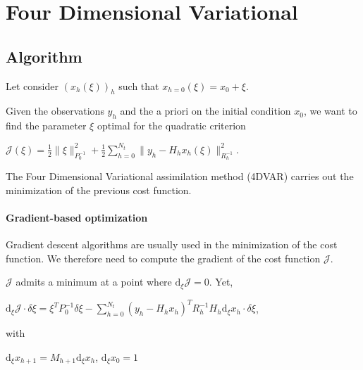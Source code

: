 \documentclass{tufte-book}
\begin{document}
\hypertarget{four_dimensional_variational}{}\section{\-Four Dimensional Variational}\label{four_dimensional_variational}


\hypertarget{four_dimensional_variational_algorithm4dv}{}\subsection{\-Algorithm}\label{four_dimensional_variational_algorithm4dv}

\-Let consider $ (x_h(\xi))_h $ such that $ x_{h=0}(\xi) = x_0 + \xi $.

\-Given the observations $ y_h $ and the a priori on the initial condition $ x_0 $, we want to find the parameter $ \xi $ optimal for the quadratic criterion \begin{center} $ \displaystyle \mathcal{J}(\xi) = \frac{1}{2} \| \xi \|^2_{P_0^{-1}} + \frac{1}{2} \displaystyle\sum\limits_{h=0}^{N_t} \|y_h - H_h x_h(\xi) \|^2_{R_h^{-1}} $. \end{center}

\-The \-Four \-Dimensional \-Variational assimilation method (4\-D\-V\-A\-R) carries out the minimization of the previous cost function.

\hypertarget{four_dimensional_variational_algorithm4dv0}{}\paragraph{\-Gradient-\/based optimization}\label{four_dimensional_variational_algorithm4dv0}

\-Gradient descent algorithms are usually used in the minimization of the cost function. \-We therefore need to compute the gradient of the cost function $ \mathcal{J}$.

$ \mathcal{J}$ admits a minimum at a point where $ \mathrm{d}_\xi \mathcal{J} = 0 $. \-Yet, \begin{center} $ \mathrm{d}_\xi \mathcal{J} \cdot \delta \xi = \xi^T P_0^{-1} \delta \xi - \displaystyle\sum\limits_{h=0}^{N_t} (y_h - H_h x_h)^T R_h^{-1} H_h \mathrm{d}_\xi x_h \cdot \delta \xi $, \end{center}  with \begin{center} $ \mathrm{d}_\xi x_{h+1} = M_{h+1} \mathrm{d}_\xi x_h $, $ \mathrm{d}_\xi x_0 = 1 $ \end{center}
\end{document}
